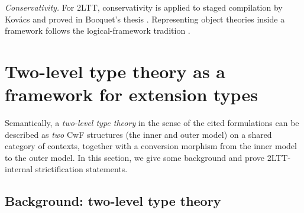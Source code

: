 \emph{Conservativity.}
For 2LTT, conservativity is applied to staged compilation by Kov\'acs
\citep{andras-staging} and proved in Bocquet's thesis
\citep[\S6.6]{BocquetThesis}.
Representing object theories
inside a framework follows the logical-framework tradition \citep{HHP1993}.


\section{Two-level type theory as a framework for extension types}\label{sec:framework}

Semantically, a \emph{two-level type theory} in the sense of the cited formulations \citep{HTS,2LTT,AltenkirchCapriottiKraus2016,Capriotti2017}
can be described as \emph{two} CwF structures (the inner and outer model) on a shared category of contexts, together with a
conversion morphism from the inner model to the outer model.
In this section, we give some background and prove 2LTT-internal strictification statements.

\subsection{Background: two-level type theory}
\label{sec:2ltt-recall}

